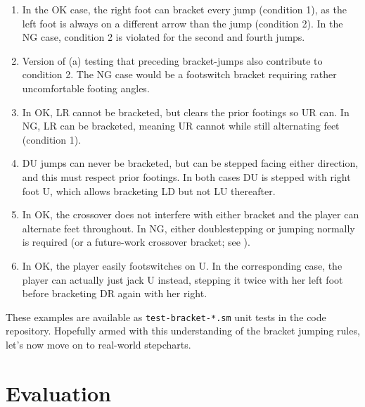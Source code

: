 \documentclass[10pt]{sigplanconf}
\begin{document}
\renewcommand{\theenumi}{\alph{enumi}}
\begin{enumerate}
	\item In the OK case, the right foot can bracket every jump (condition 1),
		as the left foot is always on a different arrow than the jump (condition 2).
		In the NG case, condition 2 is violated for the second and fourth jumps.
	\item Version of (a) testing that preceding bracket-jumps also contribute to condition 2.
		The NG case would be a footswitch bracket requiring rather uncomfortable footing angles.
	\item In OK, LR cannot be bracketed, but clears the prior footings so UR can.
		In NG, LR can be bracketed, meaning UR cannot while still alternating feet (condition 1).
	\item DU jumps can never be bracketed, but can be stepped facing either direction, and this must respect prior footings.
		In both cases DU is stepped with right foot U, which allows bracketing LD but not LU thereafter.
	\item In OK, the crossover does not interfere with either bracket and the player can alternate feet throughout.
		In NG, either doublestepping or jumping normally is required
		(or a future-work crossover bracket; see ).
	\item In OK, the player easily footswitches on U.
		In the corresponding case, the player can actually just jack U instead, stepping it twice with her left foot
		before bracketing DR again with her right.
\end{enumerate}
\renewcommand{\theenumi}{\arabic{enumi}}

These examples are available as {\tt test-bracket-*.sm} unit tests in the code repository.
Hopefully armed with this understanding of the bracket jumping rules, let's now move on to real-world stepcharts.




\section{Evaluation}
\end{document}
